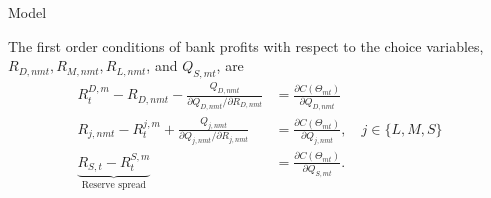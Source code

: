 \documentclass[notes,11pt, aspectratio=169]{beamer}
\begin{document}
\begin{frame}{Model}

    The first order conditions of bank profits with respect to the choice variables, $R_{D, n m t}, R_{M, n m t}, R_{L, n m t}$, and $Q_{S, m t}$, are
    $$
    \begin{aligned}
        R_t^{D, m}-R_{D, n m t}-\frac{Q_{D, n m t}}{\partial Q_{D, n m t} / \partial R_{D, n m t} }& =  \frac{\partial C\left(\Theta_{m t}\right)}{\partial Q_{D, n m t}} \\
        R_{j, n m t}- R_t^{j, m} +\frac{Q_{j, n m t}}{\partial Q_{j, n m t} / \partial R_{j, n m t}} & =  \frac{\partial C\left(\Theta_{m t}\right)}{\partial Q_{j, n m t}}, \quad j \in \{ L,M,S \}\\
    \underbrace{R_{S, t}-R_t^{S, m}}_{\text{Reserve spread}} & =\frac{\partial C\left(\Theta_{m t}\right)}{\partial Q_{S, m t}}.
    \end{aligned}
    $$

\end{frame}
\end{document}
